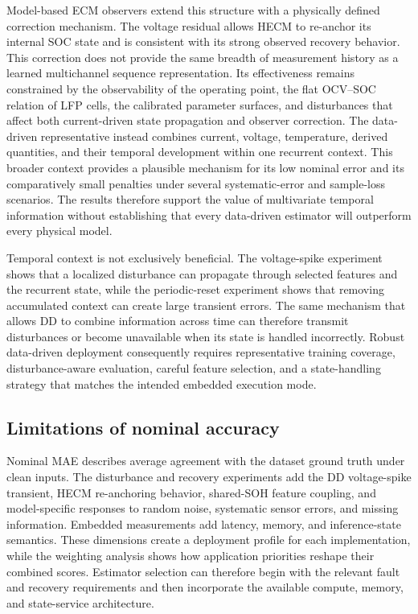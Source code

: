 \documentclass[review,nopreprintline]{elsarticle}
\begin{document}
Model-based ECM observers extend this structure with a physically defined correction mechanism. The voltage residual allows HECM to re-anchor its internal SOC state and is consistent with its strong observed recovery behavior. This correction does not provide the same breadth of measurement history as a learned multichannel sequence representation. Its effectiveness remains constrained by the observability of the operating point, the flat OCV--SOC relation of LFP cells, the calibrated parameter surfaces, and disturbances that affect both current-driven state propagation and observer correction. The data-driven representative instead combines current, voltage, temperature, derived quantities, and their temporal development within one recurrent context. This broader context provides a plausible mechanism for its low nominal error and its comparatively small penalties under several systematic-error and sample-loss scenarios. The results therefore support the value of multivariate temporal information without establishing that every data-driven estimator will outperform every physical model.

Temporal context is not exclusively beneficial. The voltage-spike experiment shows that a localized disturbance can propagate through selected features and the recurrent state, while the periodic-reset experiment shows that removing accumulated context can create large transient errors. The same mechanism that allows DD to combine information across time can therefore transmit disturbances or become unavailable when its state is handled incorrectly. Robust data-driven deployment consequently requires representative training coverage, disturbance-aware evaluation, careful feature selection, and a state-handling strategy that matches the intended embedded execution mode.

\subsection{Limitations of nominal accuracy}
Nominal MAE describes average agreement with the dataset ground truth under clean inputs. The disturbance and recovery experiments add the DD voltage-spike transient, HECM re-anchoring behavior, shared-SOH feature coupling, and model-specific responses to random noise, systematic sensor errors, and missing information. Embedded measurements add latency, memory, and inference-state semantics. These dimensions create a deployment profile for each implementation, while the weighting analysis shows how application priorities reshape their combined scores. Estimator selection can therefore begin with the relevant fault and recovery requirements and then incorporate the available compute, memory, and state-service architecture.
\end{document}

